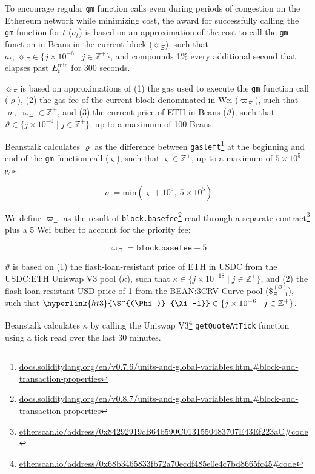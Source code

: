 \documentclass[tikz]{article}
\newcommand{\code}[1]{\texttt{#1}}
\newcommand{\fref}[1]{\footnote{\href{http://#1}{#1}}}
\newcommand{\Bean}{} %
\newcommand{\bean}{} %
\begin{document}
To encourage regular \code{gm} function calls even during periods of congestion on the Ethereum network while minimizing cost, the award for successfully calling the \code{gm} function for $t$ ($a_t$) is based on an approximation of the cost to call the \code{gm} function in Beans in the current block ($\sun_{\Xi}$), such that $a_t,\ \sun_{\Xi} \in \{j \times 10^{-6} \mid j \in \mathbb{Z}^{+} \}$, and compounds 1\% every additional second that elapses past $E_t^{\text{min}}$ for 300 seconds. 

$\sun_{\Xi}$ is based on approximations of (1) the gas used to execute the \code{gm} function call ($\varrho$), (2) the gas fee of the current block denominated in Wei ($\varpi_\Xi$), such that $\varrho,\ \varpi_\Xi \in \mathbb{Z}^{+}$, and (3) the current price of ETH in Beans ($\vartheta$), such that $\vartheta \in \{j \times 10^{-6} \mid j \in \mathbb{Z}^{+} \}$, up to a maximum of 100 Beans.

Beanstalk calculates $\varrho$ as the difference between \code{gasleft}\fref{docs.soliditylang.org/en/v0.7.6/units-and-global-variables.html\#block-and-transaction-properties} at the beginning and end of the \code{gm} function call ($\varsigma$), such that $\varsigma \in \mathbb{Z}^{+}$, up to a maximum of $5 \times 10^5$ gas:

$$\varrho = \text{min}(\varsigma + 10^5,\ 5 \times 10^5)$$

We define $\varpi_\Xi$ as the result of \code{block.basefee}\fref{docs.soliditylang.org/en/v0.8.7/units-and-global-variables.html\#block-and-transaction-properties} read through a separate contract\fref{etherscan.io/address/0x84292919cB64b590C0131550483707E43Ef223aC\#code} plus a 5 Wei buffer to account for the priority fee:

$$\varpi_\Xi = \code{block.basefee} + 5$$

$\vartheta$ is based on (1) the flash-loan-resistant price of ETH in USDC from the USDC:ETH Uniswap V3 pool ($\kappa$), such that $\kappa \in \{j \times 10^{-18} \mid j \in \mathbb{Z}^{+} \}$, and (2) the flash-loan-resistant USD price of \Bean1 from the BEAN:3CRV Curve pool (\hyperlink{ht3}{$\$^{\bean(\Phi)}_{\Xi-1}$}), such that $\hyperlink{ht3}{\$^{\bean(\Phi)}_{\Xi-1}}\in \{j \times 10^{-6} \mid j \in \mathbb{Z}^{+} \}$.

Beanstalk calculates $\kappa$ by calling the Uniswap V3\fref{etherscan.io/address/0x68b3465833fb72a70ecdf485e0e4c7bd8665fc45\#code} \code{getQuoteAtTick} function using a tick read over the last 30 minutes. 
\end{document}
